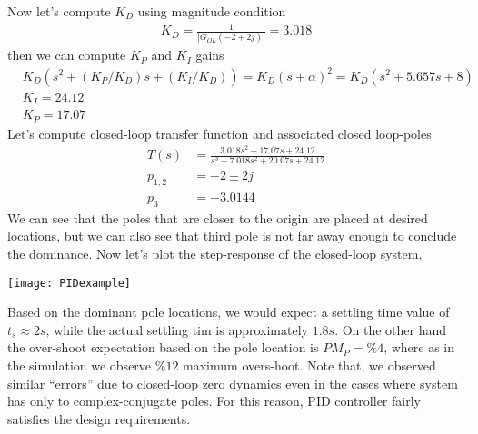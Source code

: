 \documentclass[twoside]{article}
\begin{document}
%
Now let's compute $K_D$ using magnitude condition
%
\begin{align*}
  K_D = \frac{1}{| G_{OL}(-2 + 2 j) |} = 3.018
\end{align*}
%
then we can compute $K_P$ and $K_I$ gains 
\begin{align*}
& K_D \left( s^2 +   (K_P/K_D) s  + (K_I/K_D)  \right)
= K_D (s+\alpha)^2 = K_D ( s^2 + 5.657 s + 8)
\\
& K_I = 24.12
\\
& K_P = 17.07
\end{align*}
%
Let's compute closed-loop transfer function and associated
closed loop-poles
%
\begin{align*}
  T(s) &= \frac{ 3.018 s^2 + 17.07 s + 24.12 }{ s^3 + 7.018 s^2 + 20.07
  s + 24.12  }
  \\
  p_{1,2} &= -2 \pm 2 j
\\
p_{3} &= -3.0144
\end{align*}
%
We can see that the poles that are closer to the origin are placed at 
desired locations, but we can also see that third pole is not
far away enough to conclude the dominance. Now let's plot the
step-response of the closed-loop system,

\vspace{6 pt}

  \begin{minipage}[h]{1\linewidth}
    \begin{center}
      \texttt{[image: PIDexample]}
    \end{center}
  \end{minipage}

\vspace{6 pt}

Based on the dominant pole locations, we would expect a settling
time value of $t_{s} \approx 2 s$, while the actual settling tim is 
approximately $1.8 s$. On the other hand the over-shoot expectation
based on the pole location is $PM_P = \%4$, where as in the simulation
we observe $\%12$ maximum overs-hoot. Note that, we observed similar
``errors'' due to closed-loop zero dynamics even in the cases where 
system has only to complex-conjugate poles. For this reason, PID
controller fairly satisfies the design requirements. 


\end{document}
